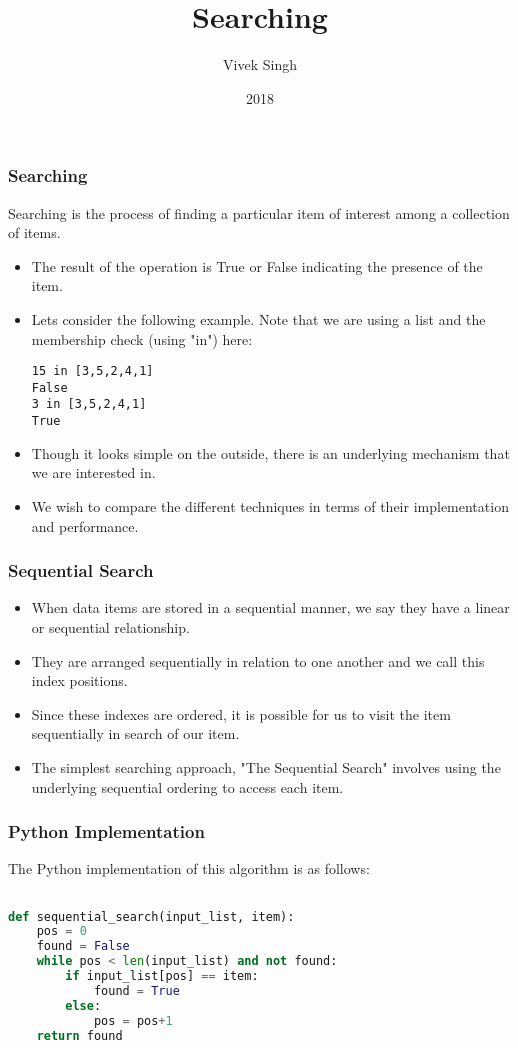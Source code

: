 \documentclass{beamer}
\title{Searching}
\author{Vivek Singh}
\institute{Information Systems Decision Sciences (ISDS)\\
MUMA College of Business\\
University of South Florida \\
Tampa, Florida}
\date{2018}
\begin{document}
\frame{\titlepage}

\begin{frame}[fragile]
\frametitle{Searching}
Searching is the process of finding a particular item of interest among a collection of items.
\begin{itemize}
\item The result of the operation is True or False indicating the presence of the item.
\item Lets consider the following example. Note that we are using a list and the membership check (using "in") here:
\begin{lstlisting}
15 in [3,5,2,4,1]
False
3 in [3,5,2,4,1]
True
\end{lstlisting}
\item Though it looks simple on the outside, there is an underlying mechanism that we are interested in.
\item We wish to compare the different techniques in terms of their implementation and performance.
\end{itemize}
\end{frame}


\begin{frame}[fragile]
\frametitle{Sequential Search}
\begin{itemize}
\item When data items are stored in a sequential manner, we say they have a linear or sequential relationship.
\item They are arranged sequentially in relation to one another and we call this index positions.
\item Since these indexes are ordered, it is possible for us to visit the item sequentially in search of our item.
\item The simplest searching approach, "The Sequential Search" involves using the underlying sequential ordering to access each item.
\end{itemize}
\end{frame}


\begin{frame}[fragile]
\frametitle{Python Implementation}
The Python implementation of this algorithm is as follows:
\begin{lstlisting}[language=Python]

def sequential_search(input_list, item):
    pos = 0
    found = False
    while pos < len(input_list) and not found:
        if input_list[pos] == item:
            found = True
        else:
            pos = pos+1
    return found
\end{lstlisting}
\end{frame}
\end{document}
